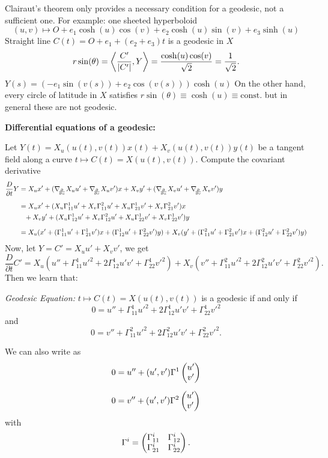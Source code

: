 \begin{remark, example}
	Clairaut's theorem only provides a necessary condition for a geodesic, not a sufficient one.
	For example: one sheeted hyperboloid
		\[ (u,v) \mapsto O + e_1\cosh(u) \cos(v) + e_2 \cosh(u) \sin(v) + e_3 \sinh(u) \]
	Straight line $ C(t) = O + e_1 + (e_2 +e_3)t $ is a geodesic in $ X $
		\[r \sin (\theta) = \left \langle \dfrac{C'}{|C'|},Y \right\rangle = \dfrac{\cosh(u) \cos(v)}{\sqrt{2}}= \dfrac{1}{\sqrt{2}}. \]
	$ Y(s) = (-e_1\sin(v(s)) + e_2\cos(v(s)))\cosh(u) $
	On the other hand, every circle of latitude in $ X $ satisfies $ r\sin(\theta) \equiv \cosh(u) \equiv \mathrm{const.} $
	but in general these are not geodesic.	
\end{remark, example}

\textbf{Differential equations of a geodesic:}
	
	Let $ Y(t) = X_u(u(t),v(t))x(t) + X_v(u(t),v(t))y(t) $ be a tangent field along a curve $ t \mapsto C(t) = X(u(t),v(t)). $
	Compute the covariant derivative
	\begin{align*}
		\dfrac{D}{\partial t} Y 
			&= X_ux' + (\nabla_{\!\!{\partial\over \partial u}} X_u u' + \nabla_{\!\!{\partial\over \partial v}} X_u v')x + X_vy' +  (\nabla_{\!\!{\partial\over \partial u}} X_v u' + \nabla_{\!\!{\partial\over \partial v}} X_v v')y \\[2mm]
		 &= X_ux' + (X_u\Gamma_{11}^1 u' + X_v\Gamma_{11}^2u' + X_u \Gamma_{21}^1v' + X_v \Gamma_{21}^2v')x \\
		 &\phantom{=} +  X_vy' + (X_u\Gamma_{12}^1 u' + X_v\Gamma_{12}^2u' + X_u \Gamma_{22}^1v' + X_v \Gamma_{22}^1v')y \\[2mm]
		 &= X_u(x' + (\Gamma_{11}^1u' + \Gamma_{21}^1v')x + (\Gamma_{12}^1 u' + \Gamma_{22}^2v')y) + X_v(y' + (\Gamma_{11}^2u' + \Gamma_{21}^2v')x + (\Gamma_{12}^2 u' + \Gamma_{22}^2v')y)
	\end{align*}
	Now, let $ Y = C' = X_u u' + X_v v' $, we get
		\[ \dfrac{D}{\partial t} C' = X_u(u'' + \Gamma_{11}^1u'^2 + 2 \Gamma_{12}^1 u'v' +\Gamma_{22}^1 v'^2) + X_v(v'' + \Gamma_{11}^2u'^2 + 2\Gamma_{12}^2u'v' + \Gamma_{22}^2v'^2). \]
	Then we learn that:
	
\begin{definition}
	\emph{Geodesic Equation:} \label{Eq: geodesic}
		$ t \mapsto C(t) = X(u(t),v(t)) $ is a geodesic if and only if
			\[ 0 = u'' + \Gamma_{11}^1u'^2 + 2 \Gamma_{12}^1 u'v' +\Gamma_{22}^1 v'^2 \]
		and
		\[ 0 = v'' + \Gamma_{11}^2u'^2 + 2\Gamma_{12}^2u'v' + \Gamma_{22}^2v'^2. \]
		
		We can also write as
		\begin{align*}
			0&= u'' +(u',v')\Gamma^1\begin{pmatrix} u'\\v' \end{pmatrix}\\[2mm]
			0&= v'' +(u',v')\Gamma^2\begin{pmatrix} u'\\v' \end{pmatrix}
		\end{align*}
		with
			\[ \Gamma^i = \begin{pmatrix} \Gamma_{11}^i & \Gamma_{12}^i\\
								\Gamma_{21}^i & \Gamma_{22}^i \end{pmatrix}. \]
		
\end{definition}


